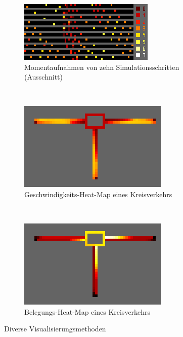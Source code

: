 \documentclass[10pt, a4paper]{article}
\begin{document}
\begin{figure}[h!]
	\centering
	\begin{subfigure}[b]{0.3\textwidth}
		\includegraphics[width=\textwidth]{img/vis_multilane_2_lanes}
		\caption{Momentaufnahmen von zehn Simulationsschritten (Ausschnitt)}
		\label{fig:momentaufnameMultilane}
	\end{subfigure}
	~
	\begin{subfigure}[b]{0.3\textwidth}
		\includegraphics[width=\textwidth]{img/vis_roundabout_speed_heat_map}
		\caption{Geschwindigkeits-Heat-Map eines Kreisverkehrs}
		\label{fig:speedMapRoundabout}
	\end{subfigure}
	~
	\begin{subfigure}[b]{0.3\textwidth}
		\includegraphics[width=\textwidth]{img/vis_roundabout_occupancy_heat_map}
		\caption{Belegungs-Heat-Map eines Kreisverkehrs}
		\label{fig:occupancyMapRoundabout}
	\end{subfigure}
	\caption{Diverse Visualisierungsmethoden}
	\label{fig:visualizationMethods}
\end{figure}
\end{document}
